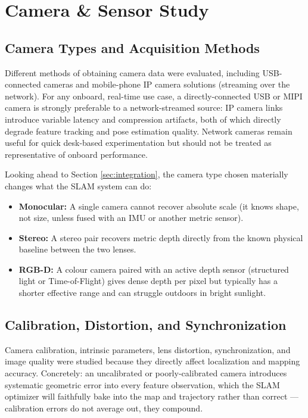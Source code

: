 \documentclass[11pt,a4paper]{article}
\begin{document}
\section{Camera \& Sensor Study}

\subsection{Camera Types and Acquisition Methods}
Different methods of obtaining camera data were evaluated, including USB-connected cameras and mobile-phone IP camera solutions (streaming over the network). For any onboard, real-time use case, a directly-connected USB or MIPI camera is strongly preferable to a network-streamed source: IP camera links introduce variable latency and compression artifacts, both of which directly degrade feature tracking and pose estimation quality. Network cameras remain useful for quick desk-based experimentation but should not be treated as representative of onboard performance.

Looking ahead to Section \ref{sec:integration}, the camera type chosen materially changes what the SLAM system can do:
\begin{itemize}[noitemsep]
    \item \textbf{Monocular:} A single camera cannot recover absolute scale (it knows shape, not size, unless fused with an IMU or another metric sensor).
    \item \textbf{Stereo:} A stereo pair recovers metric depth directly from the known physical baseline between the two lenses.
    \item \textbf{RGB-D:} A colour camera paired with an active depth sensor (structured light or Time-of-Flight) gives dense depth per pixel but typically has a shorter effective range and can struggle outdoors in bright sunlight.
\end{itemize}

\subsection{Calibration, Distortion, and Synchronization}
Camera calibration, intrinsic parameters, lens distortion, synchronization, and image quality were studied because they directly affect localization and mapping accuracy. Concretely: an uncalibrated or poorly-calibrated camera introduces systematic geometric error into every feature observation, which the SLAM optimizer will faithfully bake into the map and trajectory rather than correct --- calibration errors do not average out, they compound.
\end{document}
